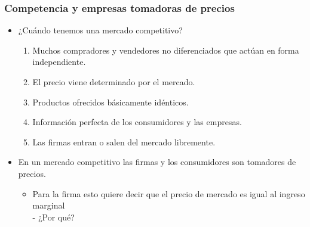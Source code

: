 \documentclass{beamer}
\begin{document}
\begin{frame}
\frametitle{Competencia y empresas tomadoras de precios}
\begin{itemize}
    \item ¿Cuándo tenemos una mercado competitivo?\vspace{2mm}
    \begin{enumerate}
        \item Muchos compradores y vendedores no diferenciados que actúan en forma independiente.\vspace{1mm}
        \item El precio viene determinado por el mercado.\vspace{1mm}
        \item Productos ofrecidos básicamente idénticos.\vspace{1mm}
        \item Información perfecta de los consumidores y las empresas.\vspace{1mm}
        \item Las firmas entran o salen del mercado libremente.
    \end{enumerate}
    \vspace{2mm}
    \item En un mercado competitivo las firmas y los consumidores son tomadores de precios.\vspace{2mm}
    \begin{itemize}
        \item Para la firma esto quiere decir que el precio de mercado es igual al ingreso marginal \\
        - ¿Por qué?
    \end{itemize}
\end{itemize}
\end{frame}
\end{document}

